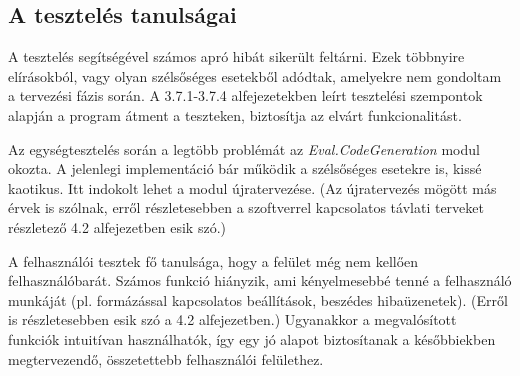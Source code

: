 \subsection{A tesztelés tanulságai}

A tesztelés segítségével számos apró hibát sikerült feltárni. Ezek többnyire elírásokból, vagy olyan szélsőséges esetekből adódtak, amelyekre nem gondoltam a tervezési fázis során. A 3.7.1-3.7.4 alfejezetekben leírt tesztelési szempontok alapján a program átment a teszteken, biztosítja az elvárt funkcionalitást.

Az egységtesztelés során a legtöbb problémát az \textit{Eval.CodeGeneration} modul okozta. A jelenlegi implementáció bár működik a szélsőséges esetekre is, kissé kaotikus. Itt indokolt lehet a modul újratervezése. (Az újratervezés mögött más érvek is szólnak, erről részletesebben a szoftverrel kapcsolatos távlati terveket részletező 4.2 alfejezetben esik szó.)

A felhasználói tesztek fő tanulsága, hogy a felület még nem kellően felhasználóbarát. Számos funkció hiányzik, ami kényelmesebbé tenné a felhasználó munkáját (pl. formázással kapcsolatos beállítások, beszédes hibaüzenetek). (Erről is részletesebben esik szó a 4.2 alfejezetben.) Ugyanakkor a megvalósított funkciók intuitívan használhatók, így egy jó alapot biztosítanak a későbbiekben megtervezendő, összetettebb felhasználói felülethez.